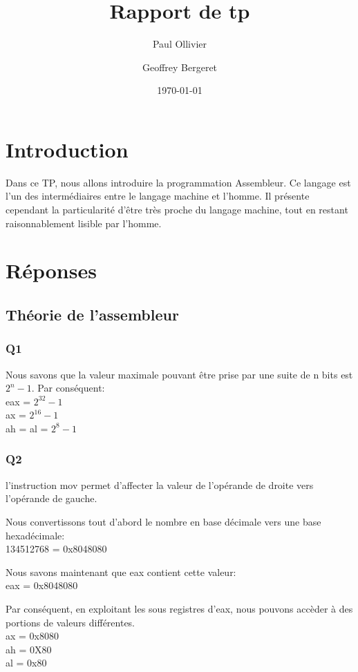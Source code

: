 \documentclass[12pt,a4paper,oneside]{article}
\title{Rapport de tp}
\author{Paul Ollivier \and Geoffrey Bergeret}
\date{\today}
\begin{document}
\maketitle
\newpage
\tableofcontents
\newpage
\section{Introduction}

Dans ce TP, nous allons introduire la programmation Assembleur. Ce langage est l'un des intermédiaires entre le langage machine et l'homme. Il présente cependant la particularité d'être très proche du langage machine, tout en restant raisonnablement lisible par l'homme.

\newpage
\section{Réponses}
\subsection{Théorie de l'assembleur}
\subsubsection{Q1} 
Nous savons que la valeur maximale pouvant être prise par une suite de n bits est $2^{n}-1$. Par conséquent:\\
eax = $2^{32}-1$\\
ax = $2^{16}-1$\\
ah = al = $2^{8}-1$\\


\subsubsection{Q2}
l'instruction mov permet d'affecter la valeur de l'opérande de droite vers l'opérande de gauche.

Nous convertissons tout d'abord le nombre en base décimale vers une base hexadécimale:\\
134512768 = 0x8048080

Nous savons maintenant que eax contient cette valeur:\\
eax = 0x8048080

Par conséquent, en exploitant les sous registres d'eax, nous pouvons accèder à des portions de valeurs différentes.\\
ax = 0x8080\\
ah = 0X80\\
al = 0x80\\
\end{document}
